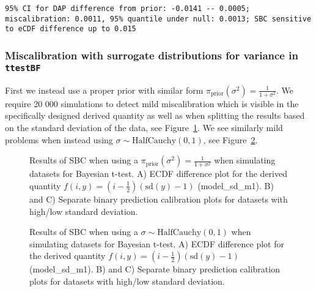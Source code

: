 \documentclass[
  letterpaper,
  DIV=11,
  numbers=noendperiod]{scrartcl}
\begin{document}
\begin{verbatim}
95% CI for DAP difference from prior: -0.0141 -- 0.0005; miscalibration: 0.0011, 95% quantile under null: 0.0013; SBC sensitive to eCDF difference up to 0.015
\end{verbatim}

\subsubsection{\texorpdfstring{Miscalibration with surrogate
distributions for variance in
\texttt{ttestBF}}{Miscalibration with surrogate distributions for variance in ttestBF}}\label{miscalibration-with-surrogate-distributions-for-variance-in-ttestbf}

First we instead use a proper prior with similar form
\(\pi_\text{prior}(\sigma^2) = \frac{1}{1 + \sigma^2}\). We require 20
000 simulations to detect mild miscalibration which is visible in the
specifically designed derived quantity as well as when splitting the
results based on the standard deviation of the data, see
Figure~\ref{fig-ttest-inv1psquared}. We see similarly mild problems when
instead using \(\sigma \sim \text{HalfCauchy}(0,1)\), see
Figure~\ref{fig-ttest-cauchy}.

\begin{figure}


\caption{\label{fig-ttest-inv1psquared}Results of SBC when using a
\(\pi_\text{prior}(\sigma^2) = \frac{1}{1 + \sigma^2}\) when simulating
datasets for Bayesian t-test. A) ECDF difference plot for the derived
quantity \(f(i, y) = (i - \frac{1}{2})(\text{sd}(y) - 1)\)
(model\_sd\_m1). B) and C) Separate binary prediction calibration plots
for datasets with high/low standard deviation.}

\end{figure}%

\begin{figure}


\caption{\label{fig-ttest-cauchy}Results of SBC when using a
\(\sigma \sim \text{HalfCauchy}(0,1)\) when simulating datasets for
Bayesian t-test. A) ECDF difference plot for the derived quantity
\(f(i, y) = (i - \frac{1}{2})(\text{sd}(y) - 1)\) (model\_sd\_m1). B)
and C) Separate binary prediction calibration plots for datasets with
high/low standard deviation.}

\end{figure}%
\end{document}
